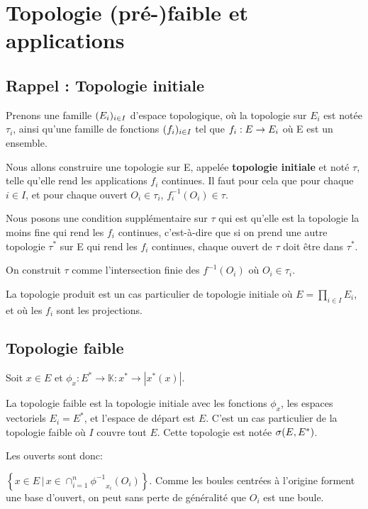 \chapter{Topologie (pré-)faible et applications}

\section{Rappel : Topologie initiale}

Prenons une famille
$(E_{i})_{i \in I}$ d'espace topologique, où la topologie sur $E_{i}$ est notée
$\tau_{i}$, ainsi qu'une famille de fonctions $(f_{i})_{i \in I}$ tel que
$f_{i} : E \rightarrow E_{i}$ où E est un ensemble.

Nous allons construire une topologie sur E, appelée \textbf{topologie initiale}
et noté $\tau$, telle qu'elle rend les applications $f_{i}$ continues. Il faut
pour cela que pour chaque $i \in I$, et pour chaque ouvert $O_{i} \in \tau_{i}$,
$f_{i}^{-1}(O_{i}) \in \tau$.

Nous posons une condition supplémentaire sur $\tau$ qui est qu'elle est la
topologie la moins fine qui rend les $f_{i}$ continues, c'est-à-dire que si on
prend une autre topologie $\tau^{*}$ sur E qui rend les $f_{i}$ continues, chaque
ouvert de $\tau$ doit être dans $\tau^{*}$.

On construit $\tau$ comme l'intersection finie des $f^{-1}(O_{i})$ où $O_{i} \in
\tau_{i}$.

\begin{exemple}
	La topologie produit est un cas particulier de topologie initiale où $E =
	\displaystyle \prod_{i \in I} E_{i}$, et où les $f_{i}$ sont les projections.
\end{exemple}

\section{Topologie faible}

Soit $x \in E$ et $\phi_{x} : E^{*} \rightarrow \mathbb{K} : x^{*} \rightarrow
|x^{*}(x)|$.

La topologie faible est la topologie initiale avec les fonctions $\phi_{x}$, les
espaces vectoriels $E_{i} = E^{*}$, et l'espace de départ est $E$. C'est un cas
particulier de la topologie faible où $I$ couvre tout $E$. Cette topologie est
notée $\sigma(E, E^{*})$.

Les ouverts sont donc:

$\left\{ x \in E \, | \, x \in \displaystyle \cap_{i = 1}^{n}
{\phi^{-1}}_{{x_{i}}}(O_{i}) \right\}$. Comme les boules centrées à l'origine
forment une base d'ouvert, on peut sans perte de généralité que $O_{i}$ est une
boule.

